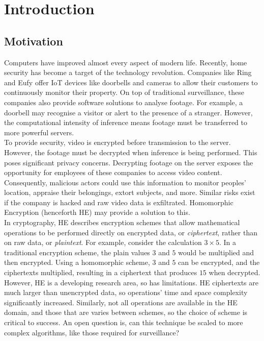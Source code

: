 
\chapter{Introduction}
\label{chap:introduction}

\section{Motivation}
\label{sec:motivation}
\indent \indent
Computers have improved almost every aspect of modern life. Recently, home security has become a target of the technology revolution. Companies like Ring \cite{RING} and Eufy \cite{EUFY} offer IoT devices like doorbells and cameras to allow their customers to continuously monitor their property. On top of traditional surveillance, these companies also provide software solutions to analyse footage. For example, a doorbell may recognise a visitor or alert to the presence of a stranger. However, the computational intensity of inference means footage must be transferred to more powerful servers. 
\smallskip \\ \indent
To provide security, video is encrypted before transmission to the server. However, the footage must be decrypted when inference is being performed. This poses significant privacy concerns. Decrypting footage on the server exposes the opportunity for employees of these companies to access video content. Consequently, malicious actors could use this information to monitor peoples' location, appraise their belongings, extort subjects, and more. Similar risks exist if the company is hacked and raw video data is exfiltrated.  Homomorphic Encryption (henceforth HE) may provide a solution to this.
\smallskip \\ \indent
In cryptography, HE describes encryption schemes that allow mathematical operations to be performed directly on encrypted data, or \textit{ciphertext}, rather than on raw data, or \textit{plaintext}. For example, consider the calculation $3 \times 5$. In a traditional encryption scheme, the plain values $3$ and $5$ would be multiplied and then encrypted. Using a homomorphic scheme, $3$ and $5$ can be encrypted, and the ciphertexts multiplied, resulting in a ciphertext that produces $15$ when decrypted. However, HE is a developing research area, so has limitations. HE ciphertexts are much larger than unencrypted data, so operations' time and space complexity significantly increased. Similarly, not all operations are available in the HE domain, and those that are varies between schemes, so the choice of scheme is critical to success. An open question is, can this technique be scaled to more complex algorithms, like those required for surveillance?
